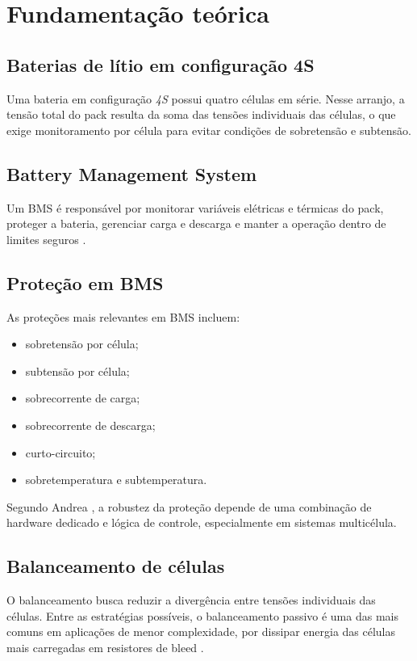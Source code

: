 \chapter{Fundamentação teórica}

\section{Baterias de lítio em configuração 4S}

Uma bateria em configuração \textit{4S} possui quatro células em série. Nesse arranjo, a tensão
total do pack resulta da soma das tensões individuais das células, o que exige monitoramento
por célula para evitar condições de sobretensão e subtensão.

\section{Battery Management System}

Um BMS é responsável por monitorar variáveis elétricas e térmicas do pack, proteger a bateria,
gerenciar carga e descarga e manter a operação dentro de limites seguros \cite{andrea2010}.

\section{Proteção em BMS}

As proteções mais relevantes em BMS incluem:

\begin{itemize}
  \item sobretensão por célula;
  \item subtensão por célula;
  \item sobrecorrente de carga;
  \item sobrecorrente de descarga;
  \item curto-circuito;
  \item sobretemperatura e subtemperatura.
\end{itemize}

Segundo Andrea \cite{andrea2010}, a robustez da proteção depende de uma combinação de hardware
dedicado e lógica de controle, especialmente em sistemas multicélula.

\section{Balanceamento de células}

O balanceamento busca reduzir a divergência entre tensões individuais das células. Entre as
estratégias possíveis, o balanceamento passivo é uma das mais comuns em aplicações de menor
complexidade, por dissipar energia das células mais carregadas em resistores de bleed
\cite{plett2015v2}.

